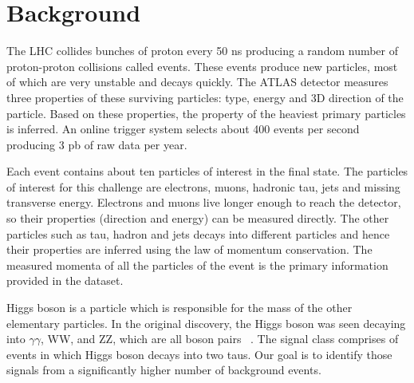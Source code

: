 \section{Background}
\label{sec:background}

The LHC collides bunches of proton every 50 ns producing a random number of proton-proton collisions called events. These events produce new particles, most of which are very unstable and decays quickly. The ATLAS detector measures three properties of these surviving particles: type, energy and 3D direction of the particle. Based on these properties,  the property of the heaviest primary particles is inferred. An online trigger system selects about 400 events per second producing 3 pb of raw data per year.

Each event contains about ten particles of interest in the final state. The particles of interest for this challenge are electrons, muons, hadronic tau, jets and missing transverse energy. Electrons and muons live longer enough to reach the detector, so their properties (direction and energy) can be measured directly. The other particles such as tau, hadron and jets decays into different particles and hence their properties are inferred using the law of momentum conservation.  The measured momenta of all the particles of the event is the primary information provided in the dataset. 

Higgs boson is a particle which is responsible for the mass of the other elementary particles. In the original discovery, the Higgs boson was seen decaying into $\gamma\gamma$, WW, and ZZ, which are all boson pairs~\cite{Ananya1,Ananya2} . The signal class comprises of events in which Higgs boson decays into two taus. Our goal is to identify those signals from a significantly higher number of background events.
